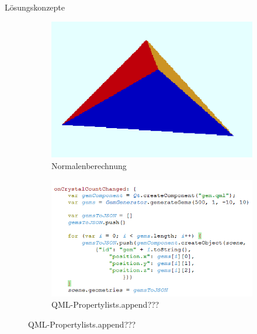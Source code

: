 \slideonetoone
{Lösungskonzepte}
{	
	\begin{figure}
		\centering
		\begin{subfigure}{\textwidth}
			\centering
			\includegraphics[width=\textwidth, height=0.3\textheight, keepaspectratio]{images/nogeometry2}
			\caption{Normalenberechnung}
		\end{subfigure}
		\begin{subfigure}{\textwidth}
			\centering
			\includegraphics[width=\textwidth, height=0.3\textheight, keepaspectratio]{images/60max2}
			\caption{QML-Propertylists.append???}
		\end{subfigure}
	\end{figure}
}
